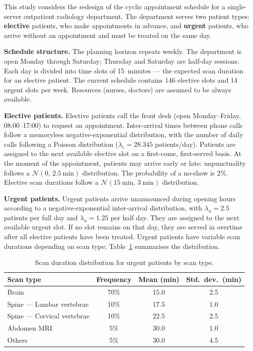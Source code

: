 \documentclass[12pt, a4paper]{article}
\newcommand{\headerrow}{\rowcolor{ugblue}\color{white}}
\newcommand{\altrow}{\rowcolor{rowgray}}
\begin{document}
This study considers the redesign of the cyclic appointment schedule for a single-server outpatient radiology department. The department serves two patient types: \textbf{elective} patients, who make appointments in advance, and \textbf{urgent} patients, who arrive without an appointment and must be treated on the same day.

\textbf{Schedule structure.} The planning horizon repeats weekly. The department is open Monday through Saturday; Thursday and Saturday are half-day sessions. Each day is divided into time slots of 15~minutes — the expected scan duration for an elective patient. The current schedule contains 146 elective slots and 14 urgent slots per week. Resources (nurses, doctors) are assumed to be always available.

\textbf{Elective patients.} Elective patients call the front desk (open Monday--Friday, 08:00--17:00) to request an appointment. Inter-arrival times between phone calls follow a memoryless negative-exponential distribution, with the number of daily calls following a Poisson distribution ($\lambda_e = 28.345$ patients/day). Patients are assigned to the next available elective slot on a first-come, first-served basis. At the moment of the appointment, patients may arrive early or late: unpunctuality follows a $\mathcal{N}(0,\, 2.5~\text{min})$ distribution. The probability of a no-show is 2\%. Elective scan durations follow a $\mathcal{N}(15~\text{min},\, 3~\text{min})$ distribution.

\textbf{Urgent patients.} Urgent patients arrive unannounced during opening hours according to a negative-exponential inter-arrival distribution, with $\lambda_u = 2.5$ patients per full day and $\lambda_u = 1.25$ per half day. They are assigned to the next available urgent slot. If no slot remains on that day, they are served in overtime after all elective patients have been treated. Urgent patients have variable scan durations depending on scan type; Table~\ref{tab:urgent_scan} summarises the distribution.

\begin{table}[ht]
\centering
\caption{Scan duration distribution for urgent patients by scan type.}
\label{tab:urgent_scan}
\small
\begin{tabular}{lccc}
\toprule
\headerrow \textbf{Scan type} & \textbf{Frequency} & \textbf{Mean (min)} & \textbf{Std.\ dev.\ (min)} \\
\midrule
Brain              & 70\% & 15.0 & 2.5 \\
\altrow Spine --- Lumbar vertebrae  & 10\% & 17.5 & 1.0 \\
Spine --- Cervical vertebrae & 10\% & 22.5 & 2.5 \\
\altrow Abdomen MRI         &  5\% & 30.0 & 1.0 \\
Others             &  5\% & 30.0 & 4.5 \\
\bottomrule
\end{tabular}
\end{table}
\end{document}
